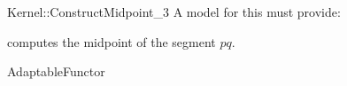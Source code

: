\begin{ccRefFunctionObjectConcept}{Kernel::ConstructMidpoint_3}
A model for this must provide:


 {computes the midpoint of the segment $pq$.}

\ccRefines
AdaptableFunctor

\ccSeeAlso
{} \\

\end{ccRefFunctionObjectConcept}

